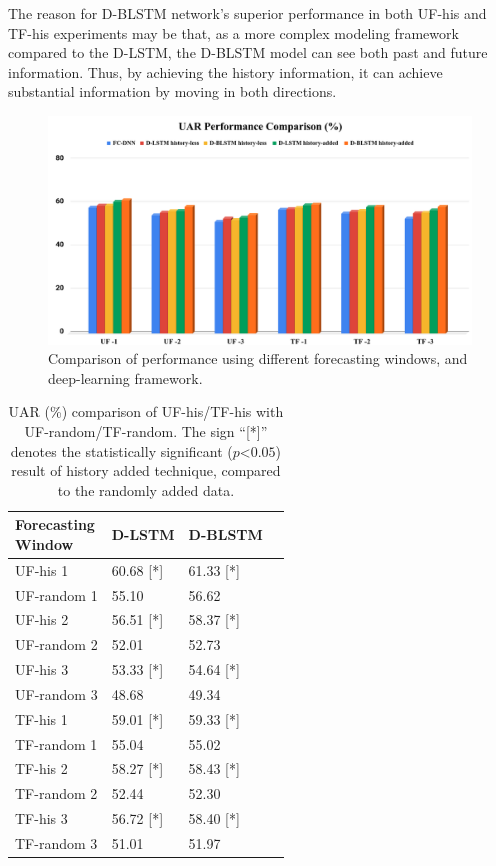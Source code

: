The reason for D-BLSTM network's superior performance in both UF-his and TF-his experiments may be that, as a more complex modeling framework compared to the D-LSTM,  the D-BLSTM model can see both past and future information. Thus, by achieving the history information, it can achieve substantial information by moving in both directions. 



\begin{figure}
\centering
\includegraphics[width=.8\linewidth]{Chapters/compare.png}
\caption[Comparison of performance using different forecasting windows, and deep-learning framework]{Comparison of performance using different forecasting windows, and deep-learning framework.}
\label{fig:compare}
\end{figure}

\begin{table}[h]
\centering
\caption{ UAR (\%) comparison of UF-his/TF-his with UF-random/TF-random. The sign ``[*]'' denotes the  statistically  significant ($p$\textless$0.05$) result of history added technique, compared to the randomly added data. }
\begin{tabular}{llll}
\hline
\makecell{\textbf{Forecasting}\\\textbf{Window}}  & \textbf{D-LSTM} & \textbf{D-BLSTM}\\
\hline
\hline
UF-his 1 & 60.68 [*] & 61.33 [*] \\
UF-random 1 & 55.10 & 56.62 \\
\hline
UF-his 2 & 56.51 [*] & 58.37 [*] \\
UF-random 2 & 52.01 & 52.73 \\
\hline
UF-his 3 & 53.33 [*] & 54.64 [*] \\
UF-random 3 & 48.68 & 49.34 \\
\hline
\hline
TF-his 1 & 59.01 [*] & 59.33 [*] \\
TF-random 1 & 55.04 & 55.02 \\
\hline
TF-his 2 & 58.27 [*] & 58.43 [*] \\
TF-random 2 & 52.44 & 52.30 \\
\hline
TF-his 3 & 56.72  [*] & 58.40 [*] \\
TF-random 3 & 51.01 & 51.97 \\
\hline
\end{tabular}
\label{table:noise}
\end{table}




